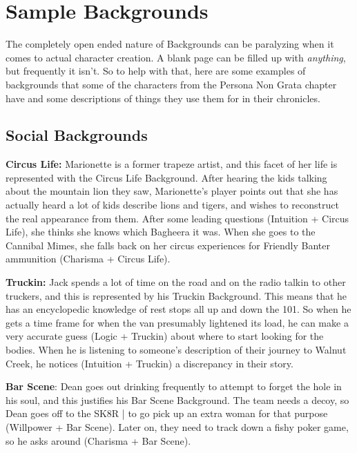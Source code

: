 \section{Sample Backgrounds}

The completely open ended nature of Backgrounds can be paralyzing when it comes to actual character creation. A blank page can be filled up with \textit{anything}, but frequently it isn't. So to help with that, here are some examples of backgrounds that some of the characters from the Persona Non Grata chapter have and some descriptions of things they use them for in their chronicles.

\subsection{Social Backgrounds}

\hspace{\parindent} \textbf{Circus Life:} Marionette is a former trapeze artist, and this facet of her life is represented with the Circus Life Background. After hearing the kids talking about the mountain lion they saw, Marionette's player points out that she has actually heard a lot of kids describe lions and tigers, and wishes to reconstruct the real appearance from them. After some leading questions (Intuition + Circus Life), she thinks she knows which Bagheera it was. When she goes to the Cannibal Mimes, she falls back on her circus experiences for Friendly Banter ammunition (Charisma + Circus Life).

\textbf{Truckin:} Jack spends a lot of time on the road and on the radio talkin to other truckers, and this is represented by his Truckin Background. This means that he has an encyclopedic knowledge of rest stops all up and down the 101. So when he gets a time frame for when the van presumably lightened its load, he can make a very accurate guess (Logic + Truckin) about where to start looking for the bodies. When he is listening to someone's description of their journey to Walnut Creek, he notices (Intuition + Truckin) a discrepancy in their story.

\textbf{Bar Scene}: Dean goes out drinking frequently to attempt to forget the hole in his soul, and this justifies his Bar Scene Background. The team needs a decoy, so Dean goes off to the SK8R | to go pick up an extra woman for that purpose (Willpower + Bar Scene). Later on, they need to track down a fishy poker game, so he asks around (Charisma + Bar Scene).

